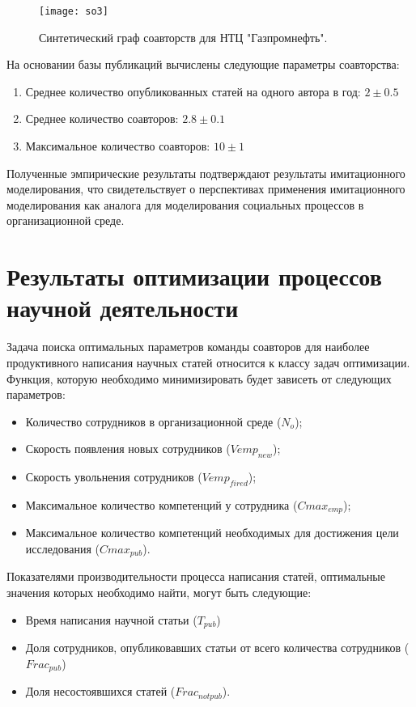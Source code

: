 \begin{figure}[H]
  \caption{Синтетический граф соавторств для НТЦ "Газпромнефть".}
  \centering
    \texttt{[image: so3]}
  \label{fig:so3}
\end{figure}  

На основании базы публикаций вычислены следующие параметры соавторства:

\begin{enumerate}
\tightlist
\item Среднее количество опубликованных статей на одного автора в год: $ 2 \pm 0.5$
\item Среднее количество соавторов: $2.8 \pm 0.1$
\item Максимальное количество соавторов: $10 \pm 1$
\end{enumerate}

Полученные эмпирические результаты подтверждают результаты имитационного моделирования, что свидетельствует о перспективах применения имитационного моделирования как аналога для моделирования социальных процессов в организационной среде.

\section{Результаты оптимизации процессов научной деятельности}
\label{sec:scrum}
Задача поиска оптимальных параметров команды соавторов для наиболее продуктивного написания научных статей относится к классу задач оптимизации. 
Функция, которую необходимо минимизировать будет зависеть от следующих параметров:

\begin{itemize}
\tightlist
\item
  Количество сотрудников в организационной среде ($N_{o}$);
\item
  Скорость появления новых сотрудников ($Vemp_{new}$);
\item
  Скорость увольнения сотрудников ($Vemp_{fired}$);
\item
  Максимальное количество компетенций у сотрудника ($Cmax_{emp}$);
\item
  Максимальное количество компетенций необходимых для достижения цели исследования ($Cmax_{pub}$).
\end{itemize}

Показателями производительности процесса написания статей, оптимальные значения которых необходимо найти, могут быть следующие:

\begin{itemize}
\tightlist
\item
  Время написания научной статьи ($T_{pub}$)
\item
  Доля сотрудников, опубликовавших статьи от всего количества
  сотрудников ($Frac_{pub}$)
\item
  Доля несостоявшихся статей ($Frac_{notpub}$).
\end{itemize}

